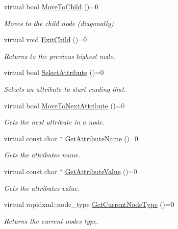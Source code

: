 \begin{DoxyCompactItemize}
virtual bool \mbox{\hyperlink{classtestAnalyser2_1_1I__RapidAbstract_a9d646b222f88e3baf52ca808288bc7c2}{Move\+To\+Child}} ()=0
\begin{DoxyCompactList}\small\item\em Moves to the child node (diagonally) \end{DoxyCompactList}\item 
\mbox{\label{classtestAnalyser2_1_1I__RapidAbstract_af11701100809bb381f75ad683e95cf11}} 
virtual void \mbox{\hyperlink{classtestAnalyser2_1_1I__RapidAbstract_af11701100809bb381f75ad683e95cf11}{Exit\+Child}} ()=0
\begin{DoxyCompactList}\small\item\em Returns to the previous highest node. \end{DoxyCompactList}\item 
virtual bool \mbox{\hyperlink{classtestAnalyser2_1_1I__RapidAbstract_a916b023a5b55e1334f6595ed9d4cb7d8}{Select\+Attribute}} ()=0
\begin{DoxyCompactList}\small\item\em Selects an attribute to start reading that. \end{DoxyCompactList}\item 
virtual bool \mbox{\hyperlink{classtestAnalyser2_1_1I__RapidAbstract_ab26e1f2ca674a3bc10b0a5b71c9a5941}{Move\+To\+Next\+Attribute}} ()=0
\begin{DoxyCompactList}\small\item\em Gets the next attribute in a node. \end{DoxyCompactList}\item 
virtual const char $\ast$ \mbox{\hyperlink{classtestAnalyser2_1_1I__RapidAbstract_a70d3e89ca2966dfb205084a1cf1f9f1f}{Get\+Attribute\+Name}} ()=0
\begin{DoxyCompactList}\small\item\em Gets the attribute\textquotesingle{}s name. \end{DoxyCompactList}\item 
virtual const char $\ast$ \mbox{\hyperlink{classtestAnalyser2_1_1I__RapidAbstract_a530a07423a4a8d9afc6222ad41d4879e}{Get\+Attribute\+Value}} ()=0
\begin{DoxyCompactList}\small\item\em Gets the attribute\textquotesingle{}s value. \end{DoxyCompactList}\item 
virtual rapidxml\+::node\+\_\+type \mbox{\hyperlink{classtestAnalyser2_1_1I__RapidAbstract_a8da0bb607ddd98b943fc07fd5ac1abe8}{Get\+Current\+Node\+Type}} ()=0
\begin{DoxyCompactList}\small\item\em Returns the current node\textquotesingle{}s type. \end{DoxyCompactList}\end{DoxyCompactItemize}


